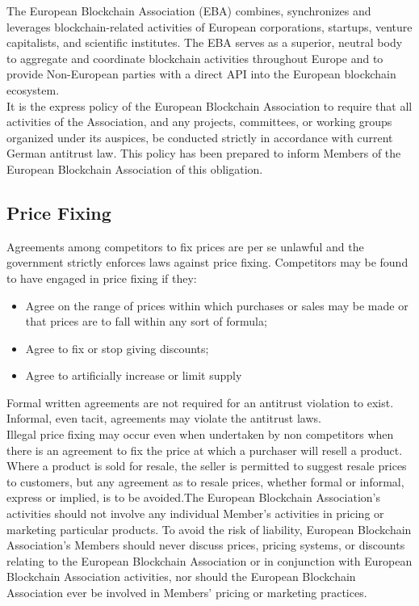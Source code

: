 \documentclass{article}
\begin{document}
The European Blockchain Association (EBA) combines, synchronizes and leverages blockchain-related activities of European corporations, startups, venture capitalists, and scientific institutes. 
The EBA serves as a superior, neutral body to aggregate and coordinate blockchain activities throughout Europe and to provide Non-European parties with a direct API into the European blockchain ecosystem. \\
It is the express policy of the European Blockchain Association to require that all activities of the Association, and any projects, committees, or working groups organized under its auspices, be conducted strictly in accordance with current German antitrust law. This policy has been prepared to inform Members of the European Blockchain Association of this obligation.

\subsection{Price Fixing}

Agreements among competitors to fix prices are per se unlawful and the government strictly enforces laws against price fixing. Competitors may be found to have engaged in price fixing if they: 

\begin{itemize}
	\item Agree on the range of prices within which purchases or sales may be made or that prices are to fall within any sort of formula;
	\item Agree to fix or stop giving discounts; 
	\item Agree to artificially increase or limit supply
\end{itemize}

Formal written agreements are not required for an antitrust violation to exist. Informal, even tacit, agreements may violate the antitrust laws. \\
Illegal price fixing may occur even when undertaken by non competitors when there is an agreement to fix the price at which a purchaser will resell a product. 
Where a product is sold for resale, the seller is permitted to suggest resale prices to customers, but any agreement as to resale prices, whether formal or informal, express or implied, is to be avoided.The European Blockchain Association's activities should not involve any individual Member's activities in pricing or marketing particular products. 
To avoid the risk of liability, European Blockchain Association's Members should never discuss prices, pricing systems, or discounts relating to the European Blockchain Association or in conjunction with European Blockchain Association activities, nor should the European Blockchain Association ever be involved in Members' pricing or marketing practices.
\end{document}
